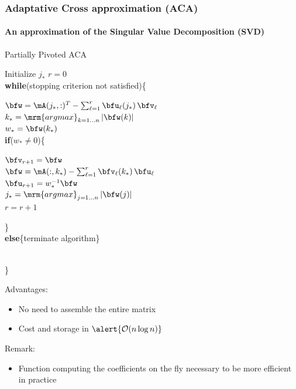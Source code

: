 
\begin{frame}

\frametitle{Adaptative Cross approximation (ACA)}
\framesubtitle{An approximation of the Singular Value Decomposition (SVD)} 
\begin{minipage}[t]{.6\linewidth}
\vspace{-0.9cm}
\begin{algorithm}[H]
  \caption{Partially Pivoted ACA}  
  Initialize $j_{*}$
  $r=0$\\
  \textbf{while}(stopping criterion not satisfied)\{\\
  \indent\hspace{0.49cm} \parbox{\linewidth}{
    $\bfw = \mA(j_{*},:)^{T} - \sum_{\ell=1}^{r}\bfu_{\ell}(j_{*})\,\bfv_{\ell}$\\
    $k_{*} = \mathop{\mrm{argmax}}_{k = 1\dots n}\vert \bfw(k)\vert$\\
    $w_{*} = \bfw(k_{*})$\\
    \textbf{if}($w_{*}\neq 0$)\{\\
    \indent\hspace{0.5cm} \parbox{\linewidth}{
      $\bfv_{r+1} = \bfw$\\
      $\bfw = \mA(:,k_{*})-\sum_{\ell = 1}^{r}\bfv_{\ell}(k_{*})\,\bfu_{\ell} $\\
      $\bfu_{r+1} = w_{*}^{-1}\bfw$\\      
      $j_{*} = \mathop{\mrm{argmax}}_{j = 1\dots n} \vert \bfw(j)\vert$\\
      $r=r+1$} 
      \}\\
    \textbf{else}\{terminate algorithm\}
    }\\
  \}
\end{algorithm}
\end{minipage}
\hfill%
\begin{minipage}[t]{.35\linewidth}
Advantages:
\medskip
\begin{itemize}
\item No need to assemble the entire matrix
\item Cost and storage in $\alert{\mathcal{O}(n \log n)}$
\end{itemize}
\medskip
Remark:
\medskip
\begin{itemize}
\item  Function computing the coefficients on the fly necessary to be more efficient in practice
\end{itemize}
\end{minipage}%

\end{frame}

